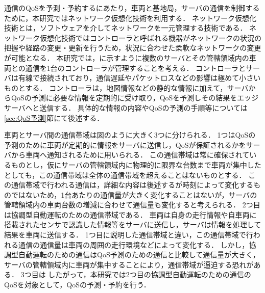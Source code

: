 \documentclass[a4paper,11pt,uplatex]{ujreport}
\begin{document}
通信のQoSを予測・予約するにあたり，車両と基地局，サーバの通信を制御するために，本研究ではネットワーク仮想化技術を利用する．
ネットワーク仮想化技術とは，ソフトウェアを介してネットワークを一元管理する技術である．
ネットワーク仮想化技術ではコントローラと呼ばれる機器がネットワークの状況の把握や経路の変更・更新を行うため，状況に合わせた柔軟なネットワークの変更が可能となる．
本研究では，に示すように複数のサーバとその管轄領域内の車両との通信を1台のコントローラが管理することを考える．
コントローラとサーバは有線で接続されており，通信遅延やパケットロスなどの影響は極めて小さいものとする．
コントローラは，地図情報などの静的な情報に加えて，サーバからQoSの予測に必要な情報を定期的に受け取り，QoSを予測しその結果をエッジサーバへと送信する．
具体的な情報の内容やQoSの予測の手順等については\ref{sec:QoS予測}節にて後述する．\par
車両とサーバ間の通信帯域は図のように大きく3つに分けられる．
1つはQoSの予測のために車両が定期的に情報をサーバに送信し，QoSが保証されるかをサーバから車両へ通知されるために用いられる．
この通信帯域は常に確保されているものとし，仮にサーバの管轄領域内に物理的に限界な台数まで車両が集中したとしても，この通信帯域は全体の通信帯域を超えることはないものとする．
この通信帯域で行われる通信は，詳細な内容は後述するが時刻によって変化するものではないため，1台あたりの通信量が大きく変化することはないが，サーバの管轄領域内の車両台数の増減に合わせて通信量も変化すると考えられる．
2つ目は協調型自動運転のための通信帯域である．
車両は自身の走行情報や自車両に搭載されたセンサで認識した情報等をサーバに送信し，サーバは情報を処理して結果を車両に送信する．
1つ目に説明した通信帯域と違い，この通信帯域で行われる通信の通信量は車両の周囲の走行環境などによって変化する．
しかし，協調型自動運転のための通信はQoS予測のための通信と比較して通信量が大きく，サーバの管轄領域内に車両が集中することにより，通信帯域が逼迫する恐れがある．
3つ目は
したがって，本研究では2つ目の協調型自動運転のための通信のQoSを対象として，QoSの予測・予約を行う．

\end{document}

